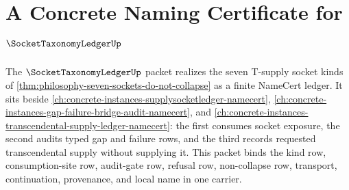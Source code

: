 \chapter{A Concrete Naming Certificate for $\SocketTaxonomyLedgerUp$}
\label{ch:concrete-instances-socket-taxonomy-ledger-namecert}

The $\SocketTaxonomyLedgerUp$ packet realizes the seven T-supply socket kinds of \autoref{thm:philosophy-seven-sockets-do-not-collapse} as a finite NameCert ledger. It sits beside \autoref{ch:concrete-instances-supplysocketledger-namecert}, \autoref{ch:concrete-instances-gap-failure-bridge-audit-namecert}, and \autoref{ch:concrete-instances-transcendental-supply-ledger-namecert}: the first consumes socket exposure, the second audits typed gap and failure rows, and the third records requested transcendental supply without supplying it. This packet binds the kind row, consumption-site row, audit-gate row, refusal row, non-collapse row, transport, continuation, provenance, and local name in one carrier.

